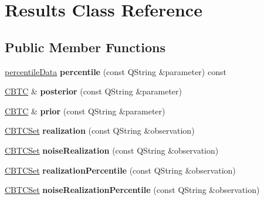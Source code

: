 \hypertarget{class_results}{}\section{Results Class Reference}
\label{class_results}
\subsection*{Public Member Functions}
\begin{DoxyCompactItemize}
\item 
\mbox{\label{class_results_a8425047e072bc33e5904e415be051287}} 
\hyperlink{structpercentile_data}{percentile\+Data} {\bfseries percentile} (const Q\+String \&parameter) const
\item 
\mbox{\label{class_results_a6c4082ffafc461425989fe28e0b9e590}} 
\hyperlink{class_c_b_t_c}{C\+B\+TC} \& {\bfseries posterior} (const Q\+String \&parameter)
\item 
\mbox{\label{class_results_ae2efabf3f02200127fc7c4028c18a47f}} 
\hyperlink{class_c_b_t_c}{C\+B\+TC} \& {\bfseries prior} (const Q\+String \&parameter)
\item 
\mbox{\label{class_results_a657e603f3571b18cf2bdc3cf4511ce6a}} 
\hyperlink{class_c_b_t_c_set}{C\+B\+T\+C\+Set} {\bfseries realization} (const Q\+String \&observation)
\item 
\mbox{\label{class_results_aaf41f0d7e26ebc40d9b958bde1ff860f}} 
\hyperlink{class_c_b_t_c_set}{C\+B\+T\+C\+Set} {\bfseries noise\+Realization} (const Q\+String \&observation)
\item 
\mbox{\label{class_results_a04fba9e36125e9d3fbecb2367e925870}} 
\hyperlink{class_c_b_t_c_set}{C\+B\+T\+C\+Set} {\bfseries realization\+Percentile} (const Q\+String \&observation)
\item 
\mbox{\label{class_results_a1273061fb388b8c6fecf92cf0579316e}} 
\hyperlink{class_c_b_t_c_set}{C\+B\+T\+C\+Set} {\bfseries noise\+Realization\+Percentile} (const Q\+String \&observation)
\item 
\mbox{\label{class_results_a3ae611db689a3a267a29394b2a27db08}} 

\end{DoxyCompactItemize}
